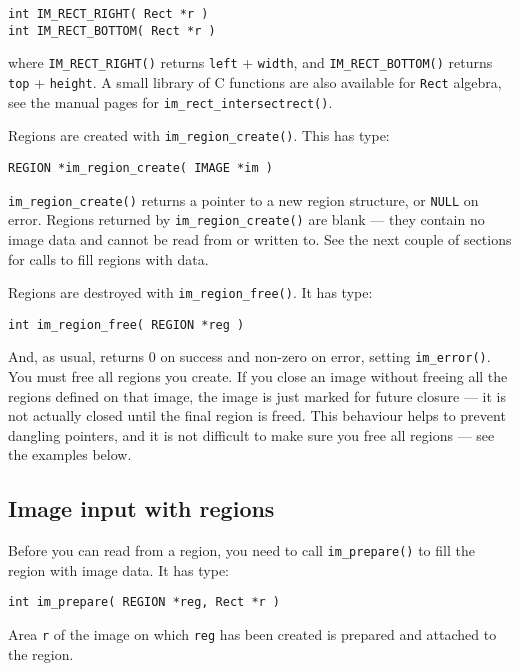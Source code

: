 \begin{verbatim}
int IM_RECT_RIGHT( Rect *r )
int IM_RECT_BOTTOM( Rect *r )
\end{verbatim}

\noindent
where \verb+IM_RECT_RIGHT()+ returns \verb+left+ + \verb+width+, and
\verb+IM_RECT_BOTTOM()+ returns \verb+top+ + \verb+height+.  A small library
of C functions are also available for \verb+Rect+ algebra, see the manual
pages for \verb+im_rect_intersectrect()+.

Regions are created with \verb+im_region_create()+. This has type:

\begin{verbatim}
REGION *im_region_create( IMAGE *im ) 
\end{verbatim}

\noindent
\verb+im_region_create()+ returns a pointer to a new region structure,
or \verb+NULL+ on error. Regions returned by \verb+im_region_create()+
are blank --- they contain no image data and cannot be read from or written
to. See the next couple of sections for calls to fill regions with data.

Regions are destroyed with \verb+im_region_free()+. It has type:

\begin{verbatim}
int im_region_free( REGION *reg ) 
\end{verbatim}

\noindent
And, as usual, returns 0 on success and non-zero on error, setting
\verb+im_error()+. You must free all regions you create. If you close
an image without freeing all the regions defined on that image, the image is
just marked for future closure --- it is not actually closed until the final
region is freed. This behaviour helps to prevent dangling pointers, and it
is not difficult to make sure you free all regions --- see the examples below.

\subsection{Image input with regions}

Before you can read from a region, you need to call \verb+im_prepare()+
to fill the region with image data. It has type:

\begin{verbatim}
int im_prepare( REGION *reg, Rect *r ) 
\end{verbatim}

Area \verb+r+ of the image on which \verb+reg+ has been created is prepared
and attached to the region.

